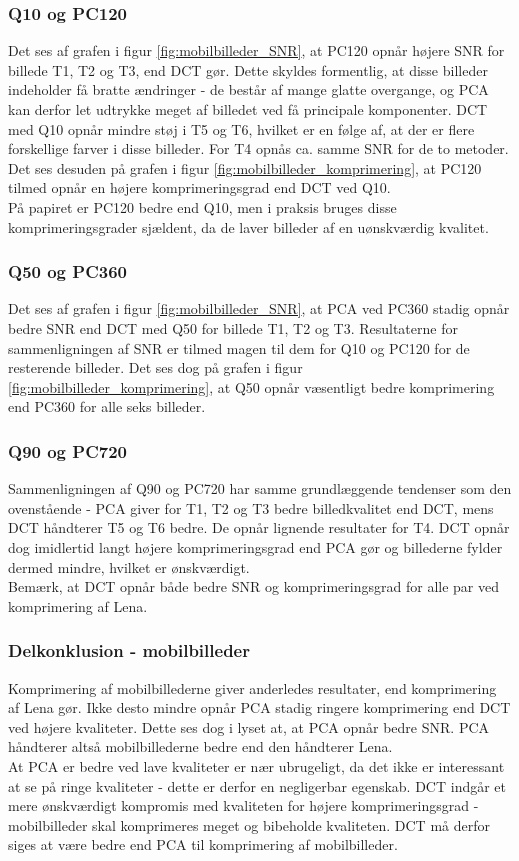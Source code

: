 \subsubsection{Q10 og PC120}
Det ses af grafen i figur \ref{fig:mobilbilleder_SNR}, at PC120 opnår højere SNR for billede T1, T2 og T3, end DCT gør. Dette skyldes formentlig, at disse billeder indeholder få bratte ændringer - de består af mange glatte overgange, og PCA kan derfor let udtrykke meget af billedet ved få principale komponenter. DCT med Q10 opnår mindre støj i T5 og T6, hvilket er en følge af, at der er flere forskellige farver i disse billeder. For T4 opnås ca. samme SNR for de to metoder.
Det ses desuden på grafen i figur \ref{fig:mobilbilleder_komprimering}, at PC120 tilmed opnår en højere komprimeringsgrad end DCT ved Q10.\\
På papiret er PC120 bedre end Q10, men i praksis bruges disse komprimeringsgrader sjældent, da de laver billeder af en uønskværdig kvalitet.

\subsubsection{Q50 og PC360}
Det ses af grafen i figur \ref{fig:mobilbilleder_SNR}, at PCA ved PC360 stadig opnår bedre SNR end DCT med Q50 for billede T1, T2 og T3. Resultaterne for sammenligningen af SNR er tilmed magen til dem for Q10 og PC120 for de resterende billeder. Det ses dog på grafen i figur \ref{fig:mobilbilleder_komprimering}, at Q50 opnår væsentligt bedre komprimering end PC360 for alle seks billeder.

\subsubsection{Q90 og PC720}
Sammenligningen af Q90 og PC720 har samme grundlæggende tendenser som den ovenstående - PCA giver for T1, T2 og T3 bedre billedkvalitet end DCT, mens DCT håndterer T5 og T6 bedre. De opnår lignende resultater for T4. DCT opnår dog imidlertid langt højere komprimeringsgrad end PCA gør og billederne fylder dermed mindre, hvilket er ønskværdigt.\\
Bemærk, at DCT opnår både bedre SNR og komprimeringsgrad for alle par ved komprimering af Lena.

\subsubsection{Delkonklusion - mobilbilleder}
Komprimering af mobilbillederne giver anderledes resultater, end komprimering af Lena gør. Ikke desto mindre opnår PCA stadig ringere komprimering end DCT ved højere kvaliteter. Dette ses dog i lyset at, at PCA opnår bedre SNR. PCA håndterer altså mobilbillederne bedre end den håndterer Lena.\\
At PCA er bedre ved lave kvaliteter er nær ubrugeligt, da det ikke er interessant at se på ringe kvaliteter - dette er derfor en negligerbar egenskab. DCT indgår et mere ønskværdigt kompromis med kvaliteten for højere komprimeringsgrad - mobilbilleder skal komprimeres meget og bibeholde kvaliteten. DCT må derfor siges at være bedre end PCA til komprimering af mobilbilleder.

